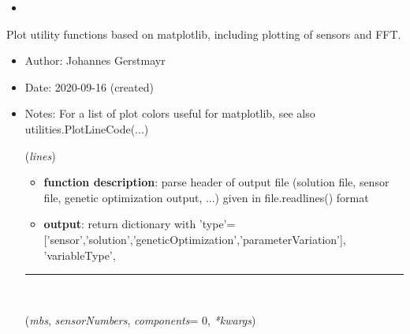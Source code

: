 \begin{itemize}[leftmargin=1.4cm]
\begin{itemize}[leftmargin=0.5cm]
\begin{itemize}[leftmargin=1.4cm]
\begin{itemize}[leftmargin=0.5cm]
\begin{itemize}[leftmargin=1.4cm]
\begin{itemize}[leftmargin=0.5cm]
\begin{itemize}[leftmargin=1.4cm]
\begin{itemize}[leftmargin=1.4cm]
\begin{itemize}[leftmargin=1.4cm]
\begin{itemize}[leftmargin=1.4cm]
\begin{itemize}[leftmargin=0.5cm]
\begin{itemize}[leftmargin=1.4cm]
\begin{itemize}[leftmargin=0.7cm]
\begin{lstlisting}[language=Python, xleftmargin=36pt]
sUser = mbs.AddSensor(SensorUserFunction(sensorNumbers=[s0,s1,s2],
                                         fileName='solution/sensorMisesStress.txt',
                                         sensorUserFunction=UFvonMisesStress))\end{lstlisting}\vspace{-24pt}\bi\item[]\vspace{-24pt}\vspace{12pt}\end{itemize}
%
\label{sec:module:plot}
 	Plot utility functions based on matplotlib, including plotting of sensors and FFT.
\begin{itemize}[leftmargin=1.4cm]
\setlength{\itemindent}{-1.4cm}
\item[]Author:    Johannes Gerstmayr
\item[]Date:      2020-09-16 (created)
\item[]Notes: 	For a list of plot colors useful for matplotlib, see also utilities.PlotLineCode(...)
\ei
\begin{flushleft}
\label{sec:plot:ParseOutputFileHeader}
({\it lines})
\end{flushleft}
\setlength{\itemindent}{0.7cm}
\begin{itemize}[leftmargin=0.7cm]
  \item[--]  {\bf function description}: parse header of output file (solution file, sensor file, genetic optimization output, ...) given in file.readlines() format  \item[--]  {\bf output}: return dictionary with 'type'=['sensor','solution','geneticOptimization','parameterVariation'], 'variableType',\vspace{12pt}\end{itemize}
%
\noindent\rule{8cm}{0.75pt}\vspace{1pt} \\ 
\begin{flushleft}
\label{sec:plot:PlotSensor}
({\it mbs}, {\it sensorNumbers}, {\it components}= 0, {\it **kwargs})
\end{flushleft}
\setlength{\itemindent}{0.7cm}
\begin{itemize}[leftmargin=0.7cm]

\end{itemize}
\end{itemize}
\end{itemize}
\end{itemize}
\end{itemize}
\end{itemize}
\end{itemize}
\end{itemize}
\end{itemize}
\end{itemize}
\end{itemize}
\end{itemize}
\end{itemize}
\end{itemize}
